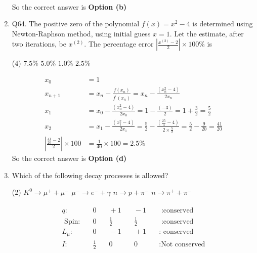 \begin{enumerate}
\begin{answer}
\begin{align*}
	\end{align*}
	So the correct answer is \textbf{Option (b)}
\end{answer}
\item Q64. The positive zero of the polynomial $f(x)=x^{2}-4$ is determined using Newton-Raphson method, using initial guess $x=1$. Let the estimate, after two iterations, be $x^{(2)}$. The percentage error $\left|\frac{x^{(2)}-2}{2}\right| \times 100 \%$ is
 \begin{tasks}(4)
	\task[\textbf{a.}] $7.5 \%$
	\task[\textbf{b.}]$5.0 \%$
	\task[\textbf{c.}] $1.0 \%$
	\task[\textbf{d.}]  $2.5 \%$
\end{tasks}
\begin{answer}
	\begin{align*}
	x_{0}&=1\\
	x_{n+1}&=x_{n}-\frac{f\left(x_{n}\right)}{f^{\prime}\left(x_{n}\right)}=x_{n}-\frac{\left(x_{n}^{2}-4\right)}{2 x_{n}} \\
	x_{1}&=x_{0}-\frac{\left(x_{n}^{2}-4\right)}{2 x_{0}}=1-\frac{(-3)}{2}=1+\frac{3}{2}=\frac{5}{2} \\
	x_{2}&=x_{1}-\frac{\left(x_{1}^{2}-4\right)}{2 x_{1}}=\frac{5}{2}-\frac{\left(\frac{25}{4}-4\right)}{2 \times \frac{5}{2}}=\frac{5}{2}-\frac{9}{20}=\frac{41}{20}\\
	\left|\frac{\frac{41}{20}-2}{2}\right| \times 100&=\frac{1}{40} \times 100=2.5 \%
	\end{align*}
	So the correct answer is \textbf{Option (d)}
\end{answer}
\item Which of the following decay processes is allowed?
 \begin{tasks}(2)
	\task[\textbf{a.}]$K^{0} \rightarrow \mu^{+}+\mu^{-}$
	\task[\textbf{b.}] $\mu^{-} \rightarrow e^{-}+\gamma$
	\task[\textbf{c.}]$n \rightarrow p+\pi^{-}$
	\task[\textbf{d.}] $n \rightarrow \pi^{+}+\pi^{-}$
\end{tasks}
\begin{answer}
	\begin{align*}
\begin{array}{lllll}
q: &\quad0 &\quad+1 &\quad-1 &\quad \text { :conserved }\\
\text { Spin:}&\quad 0 & \quad\frac{1}{2} &\quad \frac{1}{2} &\quad \text { :conserved }\\
L_{\mu}:& \quad 0 &\quad-1 &\quad+1 &\quad: \text { conserved }\\
I: &\quad \frac{1}{2} &\quad 0 &\quad 0 &\quad: \text{Not conserved}\\

\end{array}
\end{align*}
\end{answer}
\end{enumerate}
